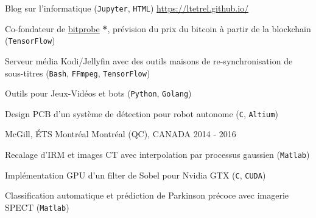 


\begin{cventries}


\cventry
{} %
{} %
{} %
{} %
{ %
\vspace{-5mm}
\begin{cvitems}
\item {Blog sur l'informatique (\texttt{Jupyter}, \texttt{HTML}) \url{https://ltetrel.github.io/}}
\item {Co-fondateur de \href{https://bitprobe.io/}{bitprobe} \textbf{*}, prévision du prix du bitcoin à partir de la blockchain (\texttt{TensorFlow})}
\item {Serveur média Kodi/Jellyfin avec des outils maisons de re-synchronisation de sous-titres (\texttt{Bash}, \texttt{FFmpeg}, \texttt{TensorFlow})}
\item {Outils pour Jeux-Vidéos et bots (\texttt{Python}, \texttt{Golang})}
\item{Design PCB d'un système de détection pour robot autonome (\texttt{C}, \texttt{Altium})}
\end{cvitems}
}


\cventry
{} %
{McGill, ÉTS Montréal} %
{\hspace{-5mm}Montréal (QC), CANADA} %
{2014 - 2016} %
{ %
\vspace{-5mm}
\begin{cvitems}
\item {Recalage d'IRM et images CT avec interpolation par processus gaussien (\texttt{Matlab})}
\item {Implémentation GPU d'un filter de Sobel pour Nvidia GTX (\texttt{C}, \texttt{CUDA})}
\item {Classification automatique et prédiction de Parkinson précoce avec imagerie SPECT  (\texttt{Matlab})}
\end{cvitems}
}


\end{cventries}
